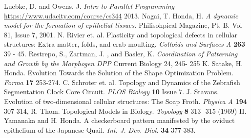 \begin{thebibliography}{1}
 Luebke, D. and Owens, J. \emph{Intro to Parallel Programming} \url{https://www.udacity.com/course/cs344} 2013.
 Nagai, T. Honda, H. \emph{A dynamic model for the formation of epithelial tissues.} Philisohpical Magazine, Pt. B. Vol 81, Issue 7, 2001.
 N. Rivier et. al. Plasticity and topological defects in cellular structures: Extra matter, folds, and crab moulting. \emph{Colloids and Surfaces A} \textbf{263} 39 - 45.
 Restrepo, S., Zartman, J. , and Basler, K. \emph{ Coordination of Patterning and Growth by the Morphogen DPP} Current Biology 24, 245- 255
 K. Satake, H. Honda. Evolution Towards the Solution of the Shape Optimization Problem. \emph{Forma} \textbf{17} 253-274.
 C. Schroter et. al. Topology and Dynamics of the Zebrafish Segmentation Clock Core Circuit. \emph{PLOS Biology} \textbf{10} Issue 7.
J. Stavans. Evolution of two-dimensional cellular structures: The Soap Froth. \emph{Physica A} \textbf{194} 307-314,
 R. Thom. Topological Models in Biology. \emph{Topology} \textbf{8} 313- 315 (1969)
 H. Yamanaka and H. Honda. A checkerboard pattern manifested by the oviduct epithelium of the Japanese Quail. \emph{Int. J. Dev. Biol.} \textbf{34} 377-383.
\end{thebibliography}
